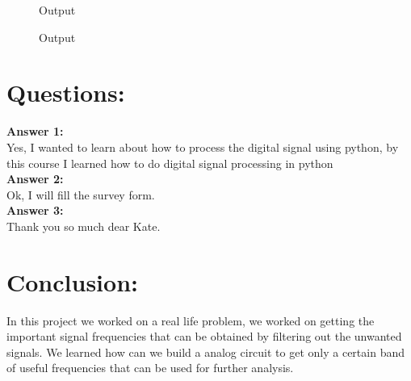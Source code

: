\documentclass[a4paper,11pt]{article}
\begin{document}
\begin{figure}[H]
\centering
{}
\label{fig:my_label}
\caption{Output}
\end{figure}



\begin{figure}[H]
\centering
{}
\label{fig:my_label}
\caption{Output}
\end{figure}



\section{Questions:}
\textbf{Answer 1:}
\\Yes, I wanted to learn about how to process the digital signal using python, by this course I learned how to do digital signal processing in python
\\ \textbf{Answer 2:}
\\ Ok, I will fill the survey form.
\\ \textbf{Answer 3:} 
\\Thank you so much dear Kate.

\section{Conclusion:}
In this project we worked on a real life problem, we worked on getting the important signal frequencies that can be obtained by filtering out the unwanted signals. We learned how can we build a analog circuit to get only a certain band of useful frequencies that can be used for further analysis.
\end{document}
